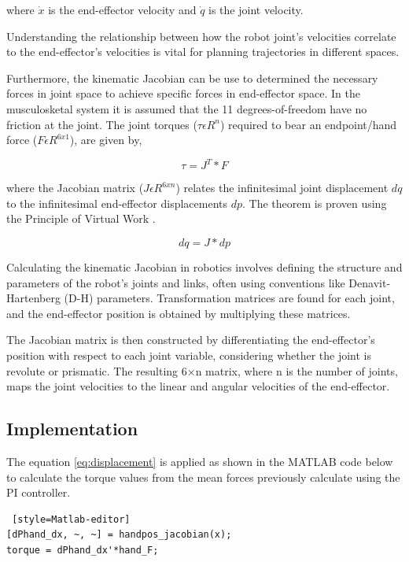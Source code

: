 where $\dot{x}$ is the end-effector velocity and $\dot{q}$ is the joint velocity.

Understanding the relationship between how the robot joint's velocities correlate to the end-effector's velocities is vital for planning trajectories in different spaces.

Furthermore, the kinematic Jacobian can be use to determined the necessary forces in joint space to achieve specific forces in end-effector space. In the musculosketal system it is assumed that the 11 degrees-of-freedom have no friction at the joint. The joint torques ($ \tau \epsilon R^n$) required to bear an endpoint/hand force ($F \epsilon R^{6x1}$), are given by,

\begin{equation}
    \tau = J^T*F
\end{equation}

where the Jacobian matrix ($J \epsilon R^{6xn}$) relates the infinitesimal joint displacement $dq$ to the infinitesimal end-effector displacements $dp$. The theorem is proven using the Principle of Virtual Work \cite{ITR}.

\begin{equation}\label{eq:displacement}
    dq = J*dp
\end{equation} 

Calculating the kinematic Jacobian in robotics involves defining the structure and parameters of the robot's joints and links, often using conventions like Denavit-Hartenberg (D-H) parameters. Transformation matrices are found for each joint, and the end-effector position is obtained by multiplying these matrices.

The Jacobian matrix is then constructed by differentiating the end-effector's position with respect to each joint variable, considering whether the joint is revolute or prismatic. The resulting 6×n matrix, where n is the number of joints, maps the joint velocities to the linear and angular velocities of the end-effector.

\subsection{Implementation}
The equation \ref{eq:displacement} is applied as shown in the MATLAB code below to calculate the torque values from the mean forces previously calculate using the PI controller. 

\begin{lstlisting} [style=Matlab-editor]
[dPhand_dx, ~, ~] = handpos_jacobian(x);
torque = dPhand_dx'*hand_F;
\end{lstlisting}

